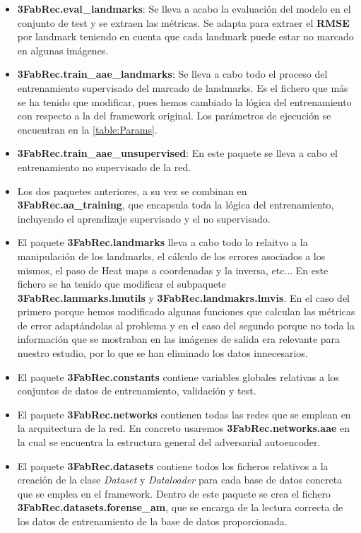 \begin{itemize}
    \item \textcolor{mygreen}{\textbf{3FabRec.eval\_landmarks}}: Se lleva a acabo la evaluación del modelo en el conjunto de test y se extraen las métricas. Se adapta para extraer el \textbf{RMSE} por landmark teniendo en cuenta que cada landmark puede estar no marcado en algunas imágenes.
    \item \textcolor{mygreen}{\textbf{3FabRec.train\_aae\_landmarks}}: Se lleva a cabo todo el proceso del entrenamiento supervisado del marcado de landmarks. Es el fichero que más se ha tenido que modificar, pues hemos cambiado la lógica del entrenamiento con respecto a la del framework original. Los parámetros de ejecución se encuentran en la \autoref{table:Params}.
    \item \textbf{3FabRec.train\_aae\_unsupervised}: En este paquete se lleva a cabo el entrenamiento no supervisado de la red.
    \item Los dos paquetes anteriores, a su vez se combinan en \textbf{3FabRec.aa\_training}, que encapsula toda la lógica del entrenamiento, incluyendo el aprendizaje supervisado y el no supervisado.
    \item El paquete \textbf{3FabRec.landmarks} lleva a cabo todo lo relaitvo a la manipulación de los landmarks, el cálculo de los errores asociados a los mismos, el paso de Heat maps a coordenadas y la inversa, etc... En este fichero se ha tenido que modificar el subpaquete \textcolor{mygreen}{\textbf{3FabRec.lanmarks.lmutils}} y \textcolor{mygreen}{\textbf{3FabRec.landmakrs.lmvis}}. En el caso del primero porque hemos modificado algunas funciones que calculan las métricas de error adaptándolas al problema y en el caso del segundo porque no toda la información que se mostraban en las imágenes de salida era relevante para nuestro estudio, por lo que se han eliminado los datos innecesarios.
    \item El paquete \textbf{3FabRec.constants} contiene variables globales relativas a los conjuntos de datos de entrenamiento, validación y test.
    \item El paquete \textbf{3FabRec.networks} contienen todas las redes que se emplean en la arquitectura de la red. En concreto usaremos \textbf{3FabRec.networks.aae} en la cual se encuentra la estructura general del adversarial autoencoder.
    \item El paquete \textbf{3FabRec.datasets} contiene todos los ficheros relativos a la creación de la clase \textit{Dataset} y \textit{Dataloader} para cada base de datos concreta que se emplea en el framework. Dentro de este paquete se crea el fichero \textcolor{mygreen}{\textbf{3FabRec.datasets.forense\_am}}, que se encarga de la lectura correcta de los datos de entrenamiento de la base de datos proporcionada.
\end{itemize}


